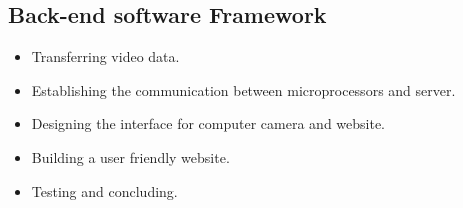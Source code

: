 \subsection{Back-end software Framework} \label{sec:sol_proc} %
\begin{itemize}
\item Transferring video data. 

\item Establishing the communication between microprocessors and server.

\item Designing the interface for computer camera and website.

\item Building a user friendly website.

\item Testing and concluding.
\end{itemize}


